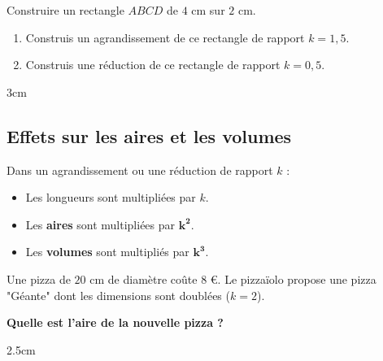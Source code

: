 \documentclass[a4paper]{book}
\begin{document}
    \begin{exemple}
        Construire un rectangle $ABCD$ de $4$ cm sur $2$ cm.
        \begin{enumerate}
            \item Construis un agrandissement de ce rectangle de rapport $k = 1,5$.
            \item Construis une réduction de ce rectangle de rapport $k = 0,5$.
        \end{enumerate}
        \begin{ZoneReponse}{3cm}
        \end{ZoneReponse}
    \end{exemple}
    
\subsection{Effets sur les aires et les volumes}
    
    \begin{propriete}
        Dans un agrandissement ou une réduction de rapport $k$ :
        \begin{itemize}
            \item Les longueurs sont multipliées par $k$.
            \item Les \textbf{aires} sont multipliées par $\mathbf{k^2}$.
            \item Les \textbf{volumes} sont multipliés par $\mathbf{k^3}$.
        \end{itemize}
    \end{propriete}
    
    
    \begin{exemple}
        Une pizza de $20$ cm de diamètre coûte $8$ \euro. Le pizzaïolo propose une pizza "Géante" dont les dimensions sont doublées ($k=2$).
        
        \textbf{Quelle est l'aire de la nouvelle pizza ?}
        \begin{ZoneReponse}{2.5cm}
        \end{ZoneReponse}
    \end{exemple}
\end{document}
